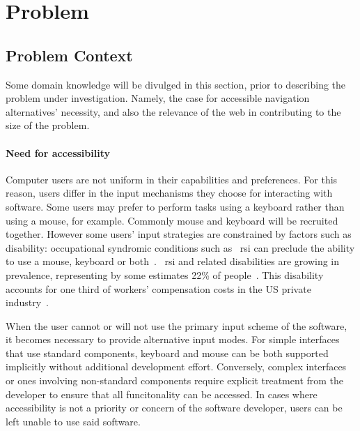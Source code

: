 \documentclass[11pt,openright,a4paper]{report}
\begin{document}
\section{Problem}
\subsection{Problem Context}
Some domain knowledge will be divulged in this section, prior to describing the problem under investigation. Namely, the case for accessible navigation alternatives' necessity, and also the relevance of the web in contributing to the size of the problem.
\paragraph{Need for accessibility}
Computer users are not uniform in their capabilities and preferences. For this reason, users differ in the input mechanisms they choose for interacting with software. Some users may prefer to perform tasks using a keyboard rather than using a mouse, for example. Commonly mouse and keyboard will be recruited together. However some users' input strategies are constrained by factors such as disability: occupational syndromic conditions such as ~\gls{rsi} can preclude the ability to use a mouse, keyboard or both~\cite{trewin1999keyboard}. ~\gls{rsi} and related disabilities are growing in prevalence, representing by some estimates 22\% of people~\cite{rsiprevalence}. This disability accounts for one third of workers' compensation costs in the US private industry~\cite{barr2002pathophysiological}.

When the user cannot or will not use the primary input scheme of the software, it becomes necessary to provide alternative input modes. For simple interfaces that use standard components, keyboard and mouse can be both supported implicitly without additional development effort. Conversely, complex interfaces or ones involving non-standard components require explicit treatment from the developer to ensure that all funcitonality can be accessed. In cases where accessibility is not a priority or concern of the software developer, users can be left unable to use said software.
\end{document}
